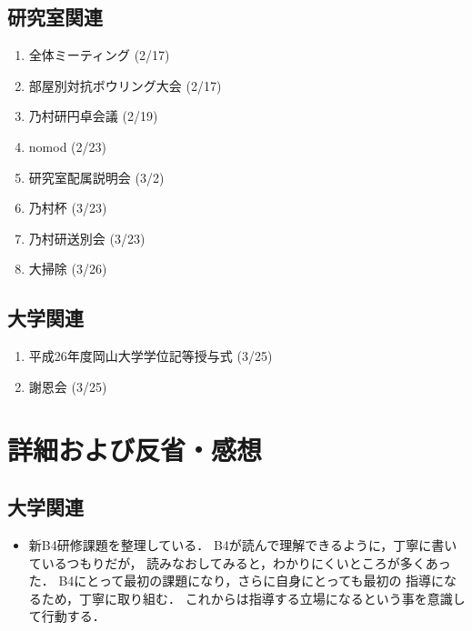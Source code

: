 \documentclass[fleqn, 14pt]{extarticle}
\begin{document}
\subsection{研究室関連}
\label{sec-2-2}
\begin{enumerate}
\item 全体ミーティング 
\hfill
\label{enum-lab1}
(2/17)

\label{sec-2-2}
\item 部屋別対抗ボウリング大会 
\hfill
\label{enum-lab1}
(2/17)

\label{sec-2-2}
\item 乃村研円卓会議 
\hfill
\label{enum-lab1}
(2/19)

\label{sec-2-2}
\item nomod 
\hfill
\label{enum-lab1}
(2/23)

\item 研究室配属説明会 
\hfill
\label{enum-18}
(3/2)

\item 乃村杯 
\hfill
\label{enum-18}
(3/23)

\item 乃村研送別会 
\hfill
\label{enum-18}
(3/23)

\item 大掃除 
\hfill
\label{enum-18}
(3/26)
\end{enumerate}

\subsection{大学関連}
\label{sec2-3}
\begin{enumerate}
    \item 平成26年度岡山大学学位記等授与式
    \hfill
    \label{enum-univ2}
    (3/25)

    \item 謝恩会
    \hfill
    \label{enum-univ2}
    (3/25)

\end{enumerate}

\section{詳細および反省・感想}
\label{sec-3}
\setcounter{subsection}{2}
\subsection{大学関連}
\label{sec-3-1}
\begin{itemize}
\item[(\ref{enum-3-A})]
    新B4研修課題を整理している．
    B4が読んで理解できるように，丁寧に書いているつもりだが，
    読みなおしてみると，わかりにくいところが多くあった．
    B4にとって最初の課題になり，さらに自身にとっても最初の
    指導になるため，丁寧に取り組む．
    これからは指導する立場になるという事を意識して行動する．

\end{itemize}
\end{document}
